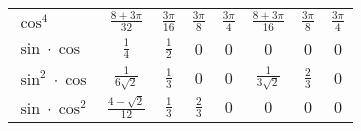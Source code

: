 \begin{tabularx}{\linewidth}{@{}lccccccc@{}}
    $\cos^4$            & $\frac{8+3\pi}{32}$              & $\frac{3\pi}{16}$               & $\frac{3\pi}{8}$      & $\frac{3\pi}{4}$       & $\frac{8+3\pi}{16}$                             & $\frac{3\pi}{8}$                                & $\frac{3\pi}{4}$           \\
    $\sin \cdot \cos$   & $\frac{1}{4}$                    & $\frac{1}{2}$                   & 0                     & 0                      & 0                                               & 0                                               & 0                          \\
    $\sin^2 \cdot \cos$ & $\frac{1}{6\sqrt{2}}$            & $\frac{1}{3}$                   & 0                     & 0                      & $\frac{1}{3\sqrt{2}}$                           & $\frac{2}{3}$                                   & 0                          \\
    $\sin \cdot \cos^2$ & $\frac{4-\sqrt{2}}{12}$          & $\frac{1}{3}$                   & $\frac{2}{3}$         & 0                      & 0                                               & 0                                               & 0                          \\
    
\end{tabularx}
\renewcommand{\arraystretch}{1}
\setlength\tabcolsep{6pt} %

